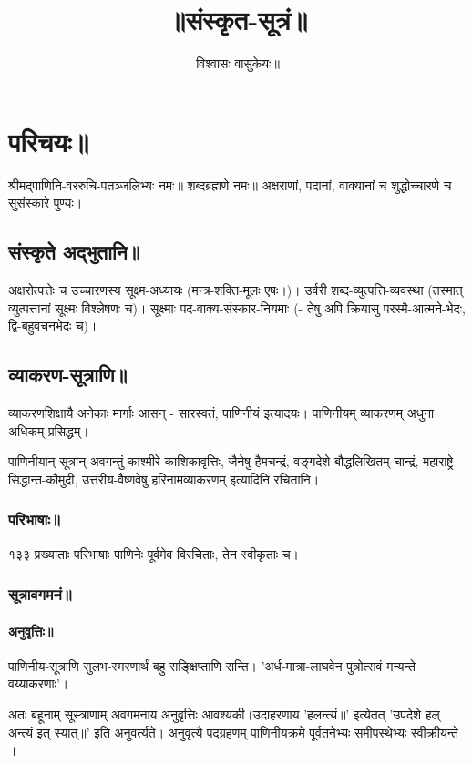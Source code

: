 \documentclass[oneside, article]{memoir}
\title{॥संस्कृत-सूत्रं॥}
\author{विश्वासः वासुकेयः॥}
\begin{document}
\maketitle

\part{परिचयः॥}
श्रीमद्पाणिनि-वररुचि-पतञ्जलिभ्यः नमः॥ शब्दब्रह्मणे नमः॥ अक्षराणां, पदानां, वाक्यानां च शुद्धोच्चारणे च सुसंस्कारे पुण्यः।

\chapter{संस्कृते अद्भुतानि॥}
अक्षरोत्पत्तेः च उच्चारणस्य सूक्ष्म-अध्यायः (मन्त्र-शक्ति-मूलः एषः।)। उर्वरी शब्द-व्युत्पत्ति-व्यवस्था (तस्मात् व्युत्पत्तानां सूक्ष्मः विश्लेषणः च)। सूक्ष्माः पद-वाक्य-संस्कार-नियमाः (- तेषु अपि क्रियासु परस्मै-आत्मने-भेदः, द्वि-बहुवचनभेदः च)।

\chapter{व्याकरण-सूत्राणि॥}
व्याकरणशिक्षायै अनेकाः मार्गाः आसन् - सारस्वतं, पाणिनीयं इत्यादयः। पाणिनीयम् व्याकरणम् अधुना अधिकम् प्रसिद्धम्।

पाणिनीयान् सूत्रान् अवगन्तुं काश्मीरे काशिकावृत्तिः, जैनेषु हैमचन्द्रं, वङ्गदेशे बौद्धलिखितम् चान्द्रं, महाराष्ट्रे सिद्धान्त-कौमुदी, उत्तरीय-वैष्णवेषु हरिनामव्याकरणम् इत्यादिनि रचितानि।

\section{परिभाषाः॥}
१३३ प्रख्याताः परिभाषाः पाणिनेः पूर्वमेव विरचिताः, तेन स्वीकृताः च। 

\section{सूत्रावगमनं॥}
\subsection{अनुवृत्तिः॥}
पाणिनीय-सूत्राणि सुलभ-स्मरणार्थं बहु सङ्क्षिप्ताणि सन्ति। 'अर्ध-मात्रा-लाघवेन पुत्रोत्सवं मन्यन्ते वय्याकरणाः'।

अतः बहूनाम् सूस्त्राणाम् अवगमनाय अनुवृत्तिः आवश्यकी।उदाहरणाय 'हलन्त्यं॥' इत्येतत् 'उपदेशे हल् अन्त्यं इत् स्यात्॥' इति अनुवर्त्यते। अनुवृत्यै पदग्रहणम् पाणिनीयक्रमे पूर्वतनेभ्यः समीपस्थेभ्यः स्वीक्रीयन्ते ।
\end{document}

